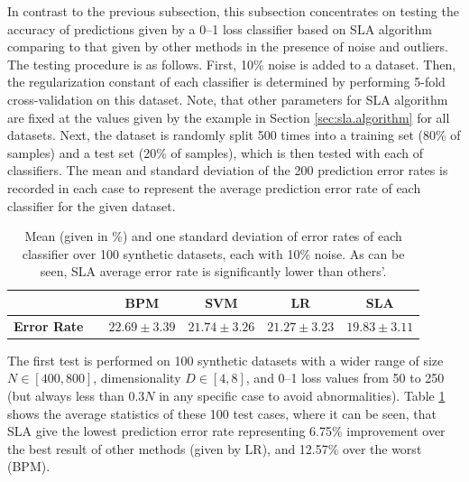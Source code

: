 In contrast to the previous subsection, this subsection concentrates
on testing the accuracy of predictions given by a 0--1 loss classifier
based on SLA algorithm comparing to that given by other methods in the
presence of noise and outliers. The testing procedure is as
follows. First, 10\% noise is added to a dataset. Then, the
regularization constant of each classifier is determined by performing
5-fold cross-validation on this dataset. Note, that other parameters
for SLA algorithm are fixed at the values given by the example in
Section \ref{sec:sla.algorithm} for all datasets. Next, the dataset is
randomly split 500 times into a training set (80\% of samples) and a
test set (20\% of samples), which is then tested with each of
classifiers. The mean and standard deviation of the 200 prediction
error rates is recorded in each case to represent the average
prediction error rate of each classifier for the given dataset.

\begin{table}[htbp!]
\centering
\begin{tabular}{|cc|  ccc|c|}
\hline\hline
 && {\bf BPM} & {\bf SVM} & {\bf LR} & {\bf SLA}\\  
\hline
{\bf Error Rate} && $22.69 \pm 3.39$  & $21.74 \pm 3.26$ & $21.27 \pm 3.23$ & $19.83 \pm 3.11$\\
\hline\hline
\end{tabular}
\caption{Mean (given in \%) and one standard deviation of error rates
  of each classifier over 100 synthetic datasets, each with 10\%
  noise. As can be seen, SLA average error rate is significantly lower
  than others'.}
\label{tab:errorrates}
\end{table}

The first test is performed on 100 synthetic datasets with a wider
range of size $N \in [400, 800]$, dimensionality $D \in [4, 8]$, and
0--1 loss values from 50 to 250 (but always less than $0.3 N$ in any
specific case to avoid abnormalities). Table \ref{tab:errorrates}
shows the average statistics of these 100 test cases, where it can be
seen, that SLA give the lowest prediction error rate representing
6.75\% improvement over the best result of other methods (given by
LR), and 12.57\% over the worst (BPM).

